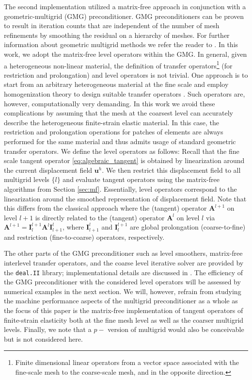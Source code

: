 \documentclass[AMA,STIX1COL]{WileyNJD-v2}
\newcommand*{\gz}[1]{\boldsymbol{#1}}
\begin{document}
The second implementation utilized a matrix-free approach in conjunction with a geometric-multigrid (GMG) preconditioner.
GMG preconditioners \cite{Bramble1990, Briggs2000, Janssen2011,May2015} can be proven to result in iteration counts that are independent of the number of mesh refinements by smoothing the residual on a hierarchy of meshes.
For further information about geometric multigrid methods we refer the reader to \cite{Briggs2000,Hackbusch1985,Wesseling1992}.
%
%
In this work, we adopt the matrix-free level operators within the GMG.
In general, given a heterogeneous non-linear material, the definition of transfer operators\footnote{Finite dimensional linear operators from a vector space associated with the fine-scale mesh to the coarse-scale mesh, and in the opposite direction.} (for restriction and prolongation) and level operators is not trivial. One approach is to start from an arbitrary heterogeneous material at the fine scale and employ homogenization theory \cite{Suquet1987, Hill1972,Hashin1983,Castaneda1997} to design suitable transfer operators \cite{Miehe2007}.
Such operators are, however, computationally very demanding.
In this work we avoid these complications by assuming
that the mesh at the coarsest level can accurately describe the heterogeneous finite-strain elastic material.
In this case, the restriction and prolongation operations for patches of elements are always performed for the same material and thus admits usage of standard geometric transfer operators.
We define the level operators as follows: Recall that the fine scale tangent operator \eqref{eq:algebraic_tangent} is obtained by linearization around the current displacement field $\gz u^h$. We then restrict this displacement field to all multigrid levels $\{l\}$ and evaluate tangent operators using the matrix-free algorithms from Section \ref{sec:mf}.
Essentially, level operators correspond to the linearization around the smoothed representation of displacement field.
Note that this differs from the classical approach where the (tangent) operator $\gz A^{l+1}$ on level $l+1$ is directly related to the (tangent) operator $\gz A^{l}$ on level $l$ via $\gz A^{l+1}=\gz I^{l+1}_{l} \gz A^l \gz I^l_{l+1}$, where $\gz I^l_{l+1}$ and $\gz I^{l+1}_l$ are global prolongation (coarse-to-fine) and restriction (fine-to-coarse) operators, respectively.

The other parts of the GMG preconditioner such as level smoothers, matrix-free interlevel transfer operators, and the coarse level iterative solver are provided by the \texttt{deal.II} library; implementational details are discussed in \cite{Clevenger2018}.
%
The efficiency of the GMG preconditioner with the considered level operators will be assessed by numerical examples in the next section.
We will, however, refrain from studying the machine performance aspects of the multigrid preconditioner as a whole as the focus of this paper is the matrix-free implementation of tangent operators of finite-strain elasticity both at the fine mesh level as well as the coarser multigrid levels.
%
Finally, we note that a $p-$ version of multigrid \cite{Ronquist1987} would also be conceivable but is not considered here.
\end{document}
